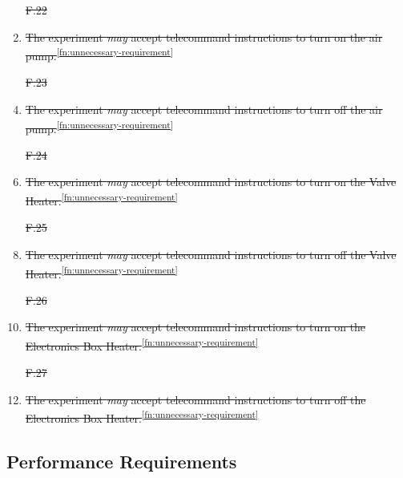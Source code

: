 \documentclass[a4paper,12pt,twoside]{article}
\providecommand{\DIFdeltex}[1]{{\protect\color{red}\sout{#1}}}                      %
\providecommand{\DIFaddbegin}{} %
\providecommand{\DIFaddend}{} %
\providecommand{\DIFdelbegin}{} %
\providecommand{\DIFdelend}{} %
\providecommand{\DIFdel}[1]{\texorpdfstring{\DIFdeltex{#1}}{}} %
\newcommand{\DIFscaledelfig}{0.5}
\newlength{\DIFdelgraphicswidth} %
\newlength{\DIFdelgraphicsheight} %
\newcommand{\DIFaddincludegraphics}[2][]{{\color{blue}\fbox{\DIFOincludegraphics[#1]{#2}}}} %
\newcommand{\DIFdelincludegraphics}[2][]{%
\sbox{\DIFdelgraphicsbox}{\DIFOincludegraphics[#1]{#2}}%
\settoboxwidth{\DIFdelgraphicswidth}{\DIFdelgraphicsbox} %
\settoboxtotalheight{\DIFdelgraphicsheight}{\DIFdelgraphicsbox} %
\scalebox{\DIFscaledelfig}{%
\parbox[b]{\DIFdelgraphicswidth}{\usebox{\DIFdelgraphicsbox}\\[-\baselineskip] \rule{\DIFdelgraphicswidth}{0em}}\llap{\resizebox{\DIFdelgraphicswidth}{\DIFdelgraphicsheight}{%
\setlength{\unitlength}{\DIFdelgraphicswidth}%
\begin{picture}(1,1)%
\thicklines\linethickness{2pt} %
{\color[rgb]{1,0,0}\put(0,0){\framebox(1,1){}}}%
{\color[rgb]{1,0,0}\put(0,0){\line( 1,1){1}}}%
{\color[rgb]{1,0,0}\put(0,1){\line(1,-1){1}}}%
\end{picture}%
}\hspace*{3pt}}} %
} %
\DeclareRobustCommand{\DIFaddbegin}{\DIFOaddbegin \let\includegraphics\DIFaddincludegraphics} %
\DeclareRobustCommand{\DIFaddend}{\DIFOaddend \let\includegraphics\DIFOincludegraphics} %
\DeclareRobustCommand{\DIFdelbegin}{\DIFOdelbegin \let\includegraphics\DIFdelincludegraphics} %
\DeclareRobustCommand{\DIFdelend}{\DIFOaddend \let\includegraphics\DIFOincludegraphics} %
\begin{document}
\begin{enumerate}[label=F.\arabic*]
    \DIFdelbegin %
\item[\DIFdel{F.22}]%
\DIFdelend \DIFaddbegin \item \DIFaddend \st{The experiment \textit{may} accept telecommand instructions to turn on the air pump.}\textsuperscript{\ref{fn:unnecessary-requirement}}
    \DIFdelbegin %
\item[\DIFdel{F.23}]%
\DIFdelend \DIFaddbegin \item \DIFaddend \st{The experiment \textit{may} accept telecommand instructions to turn off the air pump.}\textsuperscript{\ref{fn:unnecessary-requirement}}
    \DIFdelbegin %
\item[\DIFdel{F.24}]%
\DIFdelend \DIFaddbegin \item \DIFaddend \st{The experiment \textit{may} accept telecommand instructions to turn on the Valve Heater.}\textsuperscript{\ref{fn:unnecessary-requirement}}
    \DIFdelbegin %
\item[\DIFdel{F.25}]%
\DIFdelend \DIFaddbegin \item \DIFaddend \st{The experiment \textit{may} accept telecommand instructions to turn off the Valve Heater.}\textsuperscript{\ref{fn:unnecessary-requirement}}
    \DIFdelbegin %
\item[\DIFdel{F.26}]%
\DIFdelend \DIFaddbegin \item \DIFaddend \st{The experiment \textit{may} accept telecommand instructions to turn on the Electronics Box Heater.}\textsuperscript{\ref{fn:unnecessary-requirement}}
    \DIFdelbegin %
\item[\DIFdel{F.27}]%
\DIFdelend \DIFaddbegin \item \DIFaddend \st{The experiment \textit{may} accept telecommand instructions to turn off the Electronics Box Heater.}\textsuperscript{\ref{fn:unnecessary-requirement}}
\end{enumerate}
\pagebreak
\subsection{Performance Requirements}
\end{document}
